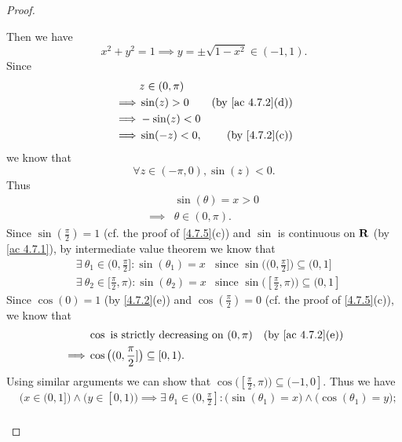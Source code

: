 \begin{proof}
\begin{itemize}
          Then we have
          \[
            x^2 + y^2 = 1 \implies y = \pm \sqrt{1 - x^2} \in (-1, 1).
          \]
          Since
          \begin{align*}
                     & z \in (0, \pi)                                  \\
            \implies & \sin(z) > 0    & \text{(by \cref{ac 4.7.2}(d))} \\
            \implies & -\sin(z) < 0                                    \\
            \implies & \sin(-z) < 0,  & \text{(by \cref{4.7.2}(c))}
          \end{align*}
          we know that
          \[
            \forall z \in (-\pi, 0), \sin(z) < 0.
          \]
          Thus
          \begin{align*}
                     & \sin(\theta) = x > 0 \\
            \implies & \theta \in (0, \pi).
          \end{align*}
          Since \(\sin(\frac{\pi}{2}) = 1\) (cf. the proof of \cref{4.7.5}(c)) and \(\sin\) is continuous on \(\mathbf{R}\) (by \cref{ac 4.7.1}), by intermediate value theorem we know that
          \begin{align*}
             & \exists\ \theta_1 \in (0, \frac{\pi}{2}] : \sin(\theta_1) = x   & \text{since } \sin\big((0, \frac{\pi}{2}]\big) \subseteq (0, 1]   \\
             & \exists\ \theta_2 \in [\frac{\pi}{2}, \pi) : \sin(\theta_2) = x & \text{since } \sin\big([\frac{\pi}{2}, \pi)\big) \subseteq (0, 1]
          \end{align*}
          Since \(\cos(0) = 1\) (by \cref{4.7.2}(e)) and \(\cos(\frac{\pi}{2}) = 0\) (cf. the proof of \cref{4.7.5}(c)), we know that
          \begin{align*}
                     & \cos \text{ is strictly decreasing on } (0, \pi)   & \text{(by \cref{ac 4.7.2}(e))} \\
            \implies & \cos\big((0, \frac{\pi}{2}]\big) \subseteq [0, 1).
          \end{align*}
          Using similar arguments we can show that \(\cos\big([\frac{\pi}{2}, \pi)\big) \subseteq (-1, 0]\).
          Thus we have
          \begin{align*}
             & \big(x \in (0, 1]\big) \land \big(y \in [0, 1)\big) \implies \exists\ \theta_1 \in (0, \frac{\pi}{2}] : \big(\sin(\theta_1) = x\big) \land \big(\cos(\theta_1) = y\big);    \\

\end{align*}
\end{itemize}
\end{proof}
